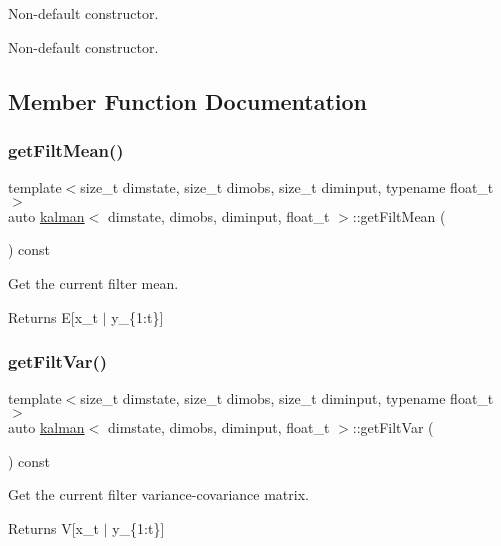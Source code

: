 Non-\/default constructor. 

Non-\/default constructor. 

\subsection{Member Function Documentation}
\mbox{\label{classkalman_a247a3cef3a1fcec8c858372014276acf}} 
\subsubsection{\texorpdfstring{get\+Filt\+Mean()}{getFiltMean()}}
{\footnotesize\ttfamily template$<$size\+\_\+t dimstate, size\+\_\+t dimobs, size\+\_\+t diminput, typename float\+\_\+t $>$ \\
auto \hyperlink{classkalman}{kalman}$<$ dimstate, dimobs, diminput, float\+\_\+t $>$\+::get\+Filt\+Mean (\begin{DoxyParamCaption}{ }\end{DoxyParamCaption}) const}



Get the current filter mean. 

\begin{DoxyReturn}{Returns}
E\mbox{[}x\+\_\+t $\vert$ y\+\_\+\{1\+:t\}\mbox{]} 
\end{DoxyReturn}
\mbox{\label{classkalman_af88f227e98383b222dc765b11df626c1}} 
\subsubsection{\texorpdfstring{get\+Filt\+Var()}{getFiltVar()}}
{\footnotesize\ttfamily template$<$size\+\_\+t dimstate, size\+\_\+t dimobs, size\+\_\+t diminput, typename float\+\_\+t $>$ \\
auto \hyperlink{classkalman}{kalman}$<$ dimstate, dimobs, diminput, float\+\_\+t $>$\+::get\+Filt\+Var (\begin{DoxyParamCaption}{ }\end{DoxyParamCaption}) const}



Get the current filter variance-\/covariance matrix. 

\begin{DoxyReturn}{Returns}
V\mbox{[}x\+\_\+t $\vert$ y\+\_\+\{1\+:t\}\mbox{]} 
\end{DoxyReturn}
\mbox{\label{classkalman_aaf359a2d65f4f0ae8eb26603205b6f9b}} 
